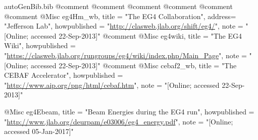 \begin{filecontents*}{autoGenBib.bib}
@comment %
@comment %
@comment %
@comment %
@comment %
@comment %
@Misc{ eg4Hm_wb,
  title = "The EG4 Collaboration",
  address= "Jefferson Lab",
  howpublished = "\url{http://clasweb.jlab.org/shift/eg4/}", 
  note = "[Online; accessed 22-Sep-2013]"
}
@comment %
@Misc{ eg4wiki,
  title = "The EG4 Wiki",
  howpublished = "\url{https://clasweb.jlab.org/rungroups/eg4/wiki/index.php/Main\_Page}", 
  note = "[Online; accessed 22-Sep-2013]"
}
@comment %
@Misc{ cebaf2_wb,
  title = "The {CEBAF} Accelerator",
  howpublished = "\url{http://www.aip.org/png/html/cebaf.htm}", 
  note = "[Online; accessed 22-Sep-2013]"
}

@Misc{ eg4Ebeam,
  title = "Beam Energies during the EG4 run",
  howpublished = "\url{http://www.jlab.org/deurpam/e03006/eg4\_energy.pdf}",
  note = "[Online; accessed 05-Jan-2017]"
}


\end{filecontents*}
